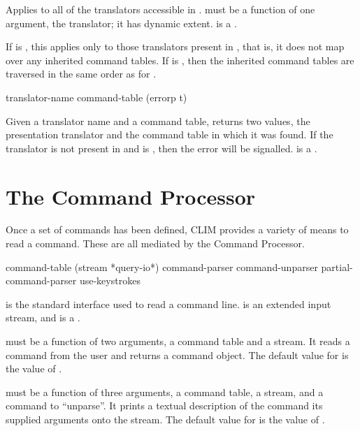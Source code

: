 Applies  to all of the translators accessible in
.   must be a function of one argument, the
translator; it has dynamic extent.   is a . 

If  is , this applies  only to
those translators present in , that is, it does
not map over any inherited command tables.  If  is
, then the inherited command tables are traversed in the same
order as for .


 {translator-name command-table \key (errorp t)}

Given a translator name and a command table, returns two values, the
presentation translator and the command table in which it was found.  If the
translator is not present in  and  is
, then the  error will be signalled.
 is a .


\section {The Command Processor}

Once a set of commands has been defined, CLIM provides a variety of means to
read a command.  These are all mediated by the Command Processor.


 {command-table 
                       \key (stream *query-io*)
                            command-parser command-unparser partial-command-parser
                            use-keystrokes} 

 is the standard interface used to read a command line.
 is an extended input stream, and  is a
.

 must be a function of two arguments, a command table and a
stream.  It reads a command from the user and returns a command object.  The
default value for  is the value of .

 must be a function of three arguments, a command table, a
stream, and a command to ``unparse''.  It prints a textual description of the
command its supplied arguments onto the stream.  The default value for
 is the value of .

